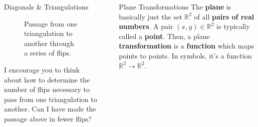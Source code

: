 \documentclass[final]{beamer}
\newlength{\sepwidth}
\newlength{\colwidth}
\newcommand{\separatorcolumn}{\begin{column}{\sepwidth}\end{column}}
\newcommand{\bfalert}[1]{\textbf{\alert{#1}}}
\newcommand{\R}{\mathbb{R}}
\begin{document}
\begin{frame}[t]
\begin{columns}[t]
\begin{column}{\colwidth}
\begin{exampleblock}{Diagonals \& Triangulations}
\begin{figure}[H]
    \caption*{Passage from one triangulation to another through a series of
    \textcolor{gevodarkblue}{flips}.}
   \end{figure}
   I encourage you to think about how to determine the number of flips necessary
   to pass from one triangulation to another. Can I have made the passage above
   in fewer flips?
  \end{exampleblock}
\end{column}

\separatorcolumn

\begin{column}{\colwidth}

 \begin{block}{Plane Transformations}
  The \bfalert{plane} is basically just the set $\R^2$ of all \textbf{pairs of
  real numbers}. A pair $(x,y) \in \R^2$ is typically called a \bfalert{point}.
  Then, a plane \bfalert{transformation} is a \textbf{function} which maps
  points to points. In symbols, it's a function $\R^2 \to \R^2$.


\end{block}
\end{column}
\end{columns}
\end{frame}
\end{document}
